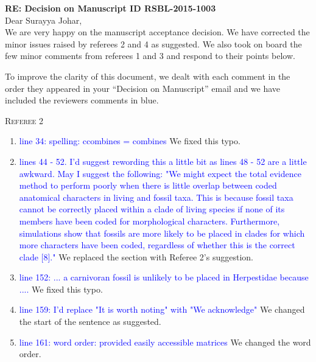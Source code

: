 \documentclass[12pt,letterpaper]{article}
\renewcommand{\section}[1]{%
\bigskip
\begin{center}
\begin{Large}
\normalfont\scshape #1
\medskip
\end{Large}
\end{center}}
\begin{document}
\textbf{RE: Decision on Manuscript ID RSBL-2015-1003}\\
\bigskip
Dear Surayya Johar,\\
\bigskip
We are very happy on the manuscript acceptance decision.
We have corrected the minor issues raised by referees 2 and 4 as suggested.
We also took on board the few minor comments from referees 1 and 3 and respond to their points below.

To improve the clarity of this document, we dealt with each comment in the order they appeared in your ``Decision on Manuscript'' email and we have included the reviewers comments in blue.



\section{Referee 2}

\begin{enumerate}
\item{\textcolor{blue}{line 34: spelling: ccombines = combines}}
We fixed this typo.

\item{\textcolor{blue}{lines 44 - 52. I'd suggest rewording this a little bit as lines 48 - 52 are a little awkward. May I suggest the following:
"We might expect the total evidence method to perform poorly when there is little overlap between coded anatomical characters in living and fossil taxa. This is because fossil taxa cannot be correctly placed within a clade of living species if none of its members have been coded for morphological characters. Furthermore, simulations show that fossils are more likely to be placed in clades for which more characters have been coded, regardless of whether this is the correct clade [8]."}}
We replaced the section with Referee 2's suggestion.

\item{\textcolor{blue}{line 152: ... a carnivoran fossil is unlikely to be placed in Herpestidae because ....}}
We fixed this typo.

\item{\textcolor{blue}{line 159: I'd replace "It is worth noting" with "We acknowledge"}}
We changed the start of the sentence as suggested.

\item{\textcolor{blue}{line 161: word order: provided easily accessible matrices}}
We changed the word order.

\end{enumerate}
\end{document}
